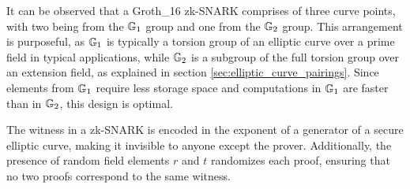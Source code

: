 It can be observed that a Groth\_16 zk-SNARK comprises of three curve points, with two being from the $\mathbb{G}_1$ group and one from the $\mathbb{G}_2$ group. This arrangement is purposeful, as $\mathbb{G}_1$ is typically a torsion group of an elliptic curve over a prime field in typical applications, while $\mathbb{G}_2$ is a subgroup of the full torsion group over an extension field, as explained in section \ref{sec:elliptic_curve_pairings}. Since elements from $\mathbb{G}_1$ require less storage space and computations in $\mathbb{G}_1$ are faster than in $\mathbb{G}_2$, this design is optimal.

The witness in a zk-SNARK is encoded in the exponent of a generator of a secure elliptic curve, making it invisible to anyone except the prover. Additionally, the presence of random field elements $r$ and $t$ randomizes each proof, ensuring that no two proofs correspond to the same witness.

